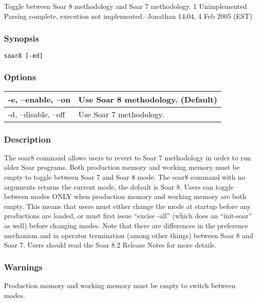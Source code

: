 \subsection{}
\label{soar8}
Toggle between Soar 8 methodology and Soar 7 methodology. 
 1 Unimplemented Parsing complete, execution not implemented.--Jonathan 14:04, 4 Feb 2005 (EST) 
\subsubsection*{Synopsis}
\begin{verbatim}
soar8 [-ed]
\end{verbatim}
\subsubsection*{Options}
\begin{tabular}{|l|l|}
\hline 
 -e, --enable, --on  & Use Soar 8 methodology. (Default)  \\
 \hline 
 -d, --disable, --off  & Use Soar 7 methodology.  \\
 \hline 
\end{tabular}
\subsubsection*{Description}
 The soar8 command allows users to revert to Soar 7 methodology in order to run older Soar programs. Both production memory and working memory must be empty to toggle between Soar 7 and Soar 8 mode. The soar8 command with no arguments returns the current mode, the default is Soar 8. Users can toggle between modes ONLY when production memory and working memory are both empty. This means that users must either change the mode at startup before any productions are loaded, or must first issue ``excise -all'' (which does an ``init-soar'' as well) before changing modes. Note that there are differences in the preference mechanism and in operator termination (among other things) between Soar 8 and Soar 7. Users should read the Soar 8.2 Release Notes for more details. 
\subsubsection*{Warnings}
 Production memory and working memory must be empty to switch between modes. 
